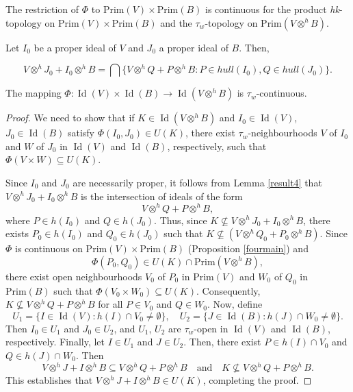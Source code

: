 \documentclass[10pt,a4paper]{amsart}
\begin{document}
\begin{prop} \label{fourmain}
    The restriction of $\Phi$ to $\text{Prim}(V) \times \text{Prim}(B)$ is continuous for the 
product \textit{hk}-topology on $\text{Prim}(V) \times \text{Prim}(B)$ and the $\tau_w$-topology on $\text{Prim}(V \otimes^h B)$.
\end{prop}

\begin{lem}\label{result4}

Let $I_0$ be a proper ideal of $V$ and $J_0$ a proper ideal of $B$. Then, 

\[
V\otimes^{h} J_0 + I_0 \otimes^{h} B = \bigcap \{ V\otimes^{h} Q + P \otimes^{h} B : P \in hull(I_0), Q\in hull(J_0) \}.
\]
\end{lem}

\begin{thm} \label{mainthm1} The mapping $\Phi: \operatorname{Id}(V) \times \operatorname{Id}(B) \to \operatorname{Id}(V \otimes^h B)$ is $\tau_w$-continuous.
\end{thm}

\begin{proof}
      We need  to show that if $K \in \operatorname{Id}(V \otimes^h B)$ and $I_0 \in \operatorname{Id}(V)$, $J_0 \in \operatorname{Id}(B)$ satisfy $\Phi(I_0, J_0) \in U(K)$,  there exist $\tau_w$-neighbourhoods $V$ of $I_0$ and $W$ of $J_0$ in $\operatorname{Id}(V)$ and $\operatorname{Id}(B)$, respectively, such that $\Phi(V \times W) \subseteq U(K)$. 

 Since $I_0$ and $J_0$ are necessarily proper, it follows from  Lemma \ref{result4} that $V\otimes^h J_0 + I_0 \otimes^h B$ is the intersection of ideals of the form
\[
V \otimes^h Q + P \otimes^h B,
\]
where $P \in h(I_0)$ and $Q \in h(J_0)$. Thus, since $K \nsubseteq V \otimes^h J_0+ I_0 \otimes^h B$,  there exists $P_0 \in h(I_0)$ and $Q_0 \in h(J_0)$ such that
 $K \nsubseteq (V \otimes^h Q_0 + P_0 \otimes^h B)$.
Since $\Phi$ is continuous on $\text{Prim}(V) \times \text{Prim}(B)$ (Proposition \ref{fourmain}) and
\[
\Phi(P_0, Q_0) \in U(K) \cap \text{Prim}(V \otimes^h B),
\]
there exist open neighbourhoods $V_0$ of $P_0$ in $\text{Prim}(V)$ and $W_0$ of $Q_0$ in $\text{Prim}(B)$ such that $\Phi(V_0 \times W_0) \subseteq U(K)$. Consequently, $K \nsubseteq V \otimes^h Q + P \otimes^h B$ for all $P \in V_0$ and $Q \in W_0$. Now, define
\[
U_1 = \{I \in \operatorname{Id}(V): h(I) \cap V_0 \neq \emptyset\}, \quad U_2 = \{J \in \operatorname{Id}(B): h(J) \cap W_0 \neq \emptyset\}.
\]
Then $I_0 \in U_1$ and $J_0 \in U_2$, and $U_1$,  $U_2$ are $\tau_w$-open in $\operatorname{Id}(V)$ and  $\operatorname{Id}(B)$, respectively. Finally, let $I \in U_1$ and $J \in U_2$. Then, there exist $P \in h(I) \cap V_0$ and $Q \in h(J) \cap W_0$. Then
\[
V \otimes^h J + I \otimes^h B \subseteq V \otimes^h Q + P \otimes^h B \quad \text{and} \quad  K \nsubseteq V \otimes^h Q + P \otimes^h B.
\]
This establishes that $V \otimes^h J + I \otimes^h B \in U(K)$, completing the proof. 
\end{proof}
\end{document}
